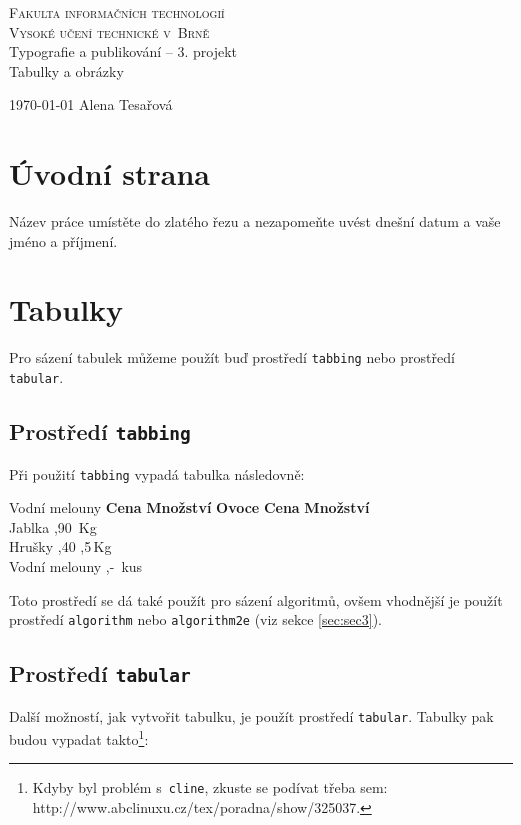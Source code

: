 \documentclass[11pt,a4paper]{article}
\author{Alena Tesařová}
\begin{document}
\begin{titlepage}

\begin{center}
\Huge
\textsc{Fakulta informačních technologií\\
Vysoké učení technické v~Brně}\\
\LARGE Typografie a publikování -- 3. projekt\\
\medskip
{\Huge Tabulky a obrázky}
\end{center}
{\Large \today \hfill
Alena Tesařová}
\end{titlepage}

\section{Úvodní strana}
Název práce umístěte do zlatého řezu a nezapomeňte uvést dnešní datum a vaše jméno a příjmení.

\section{Tabulky}
Pro sázení tabulek můžeme použít buď prostředí \texttt{tabbing} nebo prostředí \texttt{tabular}.


\subsection{Prostředí \texttt{tabbing} }
Při použití \texttt{tabbing} vypadá tabulka následovně:

\begin{tabbing}
Vodní melouny \quad\= \textbf{Cena} \quad\= \textbf{Množství} \kill
\textbf{Ovoce} 	\> \textbf{Cena} \> \textbf{Množství} 	\\
Jablka 			,90		 \,Kg 		\\
Hrušky 			,40		 ,5\,Kg \\
Vodní melouny 	,-	 		\,kus \\

\end{tabbing}

Toto prostředí se dá také použít pro sázení algoritmů, ovšem vhodnější je použít 
prostředí \texttt{algorithm} nebo \texttt{algorithm2e} (viz sekce \ref{sec:sec3}).

\subsection{Prostředí \texttt{tabular} }
Další možností, jak vytvořit tabulku, je použít prostředí \texttt{tabular}. Tabulky pak 
budou vypadat takto\footnote{Kdyby byl problém s~\texttt{cline}, zkuste se podívat třeba sem: http://www.abclinuxu.cz/tex/poradna/show/325037.}:
\end{document}

